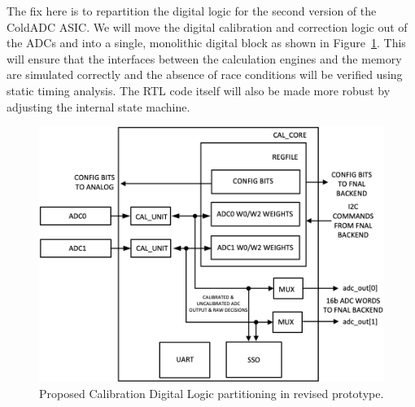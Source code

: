 The fix here is to repartition the digital logic for the second version of the ColdADC ASIC. We will move the digital calibration and correction logic out of the ADCs and into a single, monolithic digital block as shown in Figure~\ref{fig:autocalBlock_new}. This will ensure that the interfaces between the calculation engines and the memory are simulated correctly and the absence of race conditions will be verified using static timing analysis. The RTL code itself will also be made more robust by adjusting the internal state machine.
\begin{figure}[h]
\centering
\begin{center}
\includegraphics[width=1.0\textwidth]{figures/autocalBlock_new.png}
\end{center}
\caption{Proposed Calibration Digital Logic partitioning in revised prototype.}
\label{fig:autocalBlock_new}
\end{figure}

